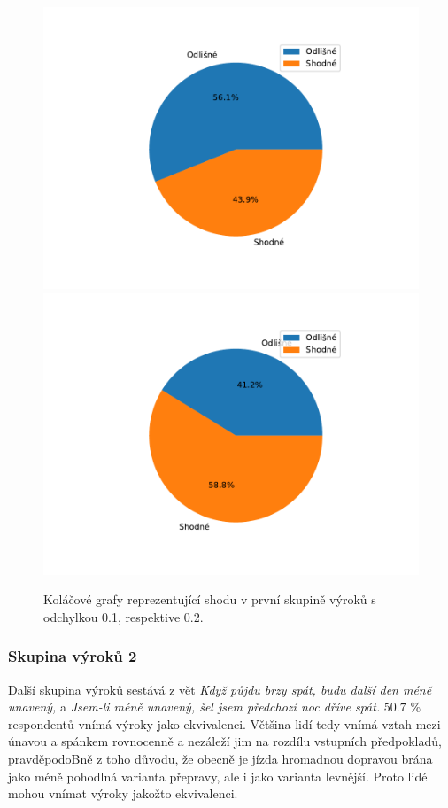     \begin{figure}[H]
    \caption{Koláčové grafy reprezentující shodu v první skupině výrok\r u s odchylkou 0.1, respektive 0.2.}
                \includegraphics[scale=0.5]{template-fig/group0.pdf}
                \includegraphics[scale=0.5]{template-fig/group00.pdf}
            \end{figure}

\subsubsection{Skupina výrok\r u 2}
Další skupina výrok\r u sestává z vět \textit{\clqq Když půjdu brzy spát, budu další den méně unavený,\crqq } \space a \textit{\clqq Jsem-li méně unavený, šel jsem předchozí noc dříve spát.\crqq } \space  $50.7$ \space $\%$ respondent\r u vnímá výroky jako ekvivalenci. Většina lidí tedy vnímá vztah mezi \' unavou a spánkem rovnocenně a nezáleží jim na rozdílu vstupních předpoklad\r u, pravděpodoBně z toho d\r uvodu, že obecně je jízda hromadnou dopravou brána jako méně pohodlná varianta přepravy, ale i jako varianta levnější. Proto lidé mohou vnímat výroky jakožto ekvivalenci.

